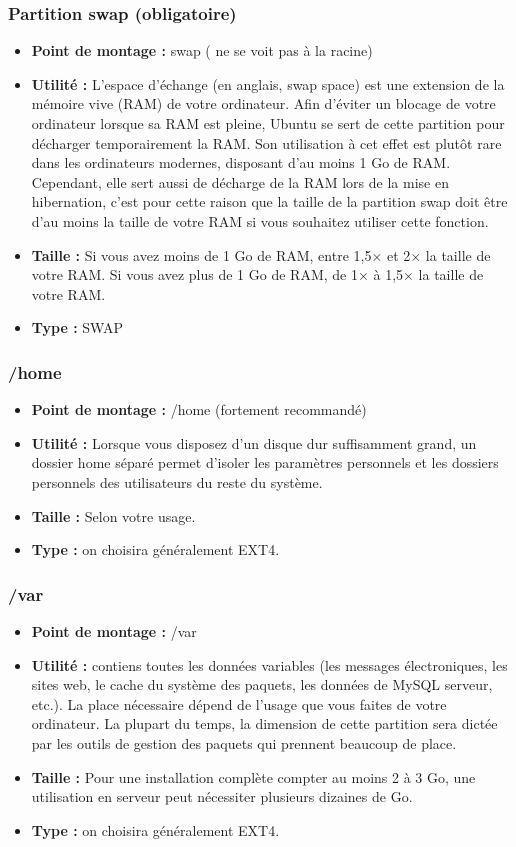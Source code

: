 \begin{frame}[containsverbatim]
	\frametitle{Partition swap (obligatoire)}
	\begin{itemize}
		\item  \textbf{Point de montage :} swap ( ne se voit pas à la racine)
		\item \textbf{Utilité :} L'espace d'échange (en anglais, swap space) est une extension de la mémoire vive (RAM) de votre ordinateur. Afin d'éviter un blocage de votre ordinateur lorsque sa RAM est pleine, Ubuntu se sert de cette partition pour décharger temporairement la RAM. Son utilisation à cet effet est plutôt rare dans les ordinateurs modernes, disposant d'au moins 1 Go de RAM. Cependant, elle sert aussi de décharge de la RAM lors de la mise en hibernation, c'est pour cette raison que la taille de la partition swap doit être d'au moins la taille de votre RAM si vous souhaitez utiliser cette fonction.
		\item\textbf{Taille :} Si vous avez moins de 1 Go de RAM, entre 1,5× et 2× la taille de votre RAM. Si vous avez plus de 1 Go de RAM, de 1× à 1,5× la taille de votre RAM. 
		\item \textbf{Type : } SWAP
	\end{itemize}
\end{frame}

\begin{frame}[containsverbatim]
	\frametitle{/home}
	\begin{itemize}
		\item  \textbf{Point de montage :} /home (fortement recommandé)
		\item \textbf{Utilité :} Lorsque vous disposez d'un disque dur suffisamment grand, un dossier home séparé permet d'isoler les paramètres personnels et les dossiers personnels des utilisateurs du reste du système.
		\item \textbf{Taille :} Selon votre usage.
		\item \textbf{Type : }on choisira généralement EXT4.
	\end{itemize}
\end{frame}

\begin{frame}[containsverbatim]
	\frametitle{/var}
	\begin{itemize}
		\item  \textbf{Point de montage :} /var 
		\item \textbf{Utilité :} contiens toutes les données variables (les messages électroniques, les sites web, le cache du système des paquets, les données de MySQL serveur, etc.). La place nécessaire dépend de l'usage que vous faites de votre ordinateur. La plupart du temps, la dimension de cette partition sera dictée par les outils de gestion des paquets qui prennent beaucoup de place.
		\item \textbf{Taille :} Pour une installation complète compter au moins 2 à 3 Go, une utilisation en serveur peut nécessiter plusieurs dizaines de Go.
		\item \textbf{Type : } on choisira généralement EXT4.
	\end{itemize}
\end{frame}


